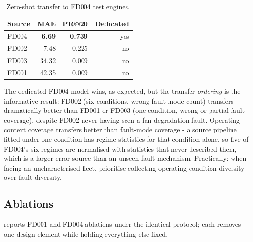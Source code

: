 \documentclass[9pt,a4paper,twocolumn,twoside]{rho-class/rho}
\begin{document}
        \begin{table}[H]
            \caption{Zero-shot transfer to FD004 test engines.}
            \label{tab:transfer}
            \begin{tabular}{lrrr}
            \toprule
            \textbf{Source} & \textbf{MAE} & \textbf{PR@20} & \textbf{Dedicated} \\
            \midrule
            FD004 & \textbf{6.69} & \textbf{0.739} & yes \\
            FD002 & 7.48 & 0.225 & no \\
            FD003 & 34.32 & 0.009 & no \\
            FD001 & 42.35 & 0.009 & no \\
            \bottomrule
            \end{tabular}
        \end{table}

        The dedicated FD004 model wins, as expected, but the transfer \emph{ordering} is the informative result: FD002 (six conditions, wrong fault-mode count) transfers dramatically better than FD001 or FD003 (one condition, wrong or partial fault coverage), despite FD002 never having seen a fan-degradation fault. Operating-context coverage transfers better than fault-mode coverage - a source pipeline fitted under one condition has regime statistics for that condition alone, so five of FD004's six regimes are normalised with statistics that never described them, which is a larger error source than an unseen fault mechanism. Practically: when facing an uncharacterised fleet, prioritise collecting operating-condition diversity over fault diversity.

    \subsection{Ablations}

         reports FD001 and FD004 ablations under the identical protocol; each removes one design element while holding everything else fixed.
\end{document}
